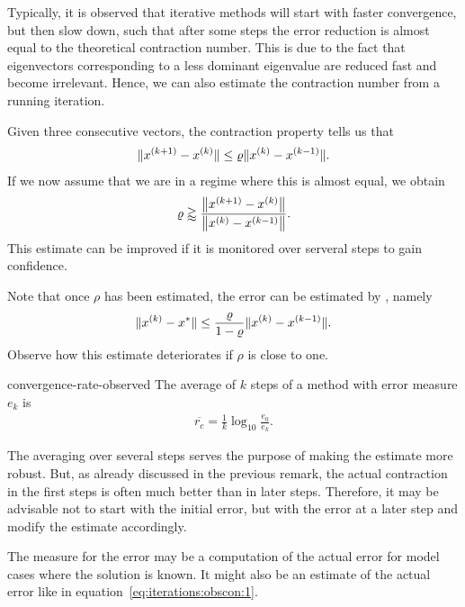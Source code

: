 \begin{remark}
  Typically, it is observed that iterative methods will start with
  faster convergence, but then slow down, such that after some steps
  the error reduction is almost equal to the theoretical contraction
  number. This is due to the fact that eigenvectors corresponding to a
  less dominant eigenvalue are reduced fast and become
  irrelevant. Hence, we can also estimate the contraction number from
  a running iteration.

  Given three consecutive vectors, the contraction property tells us
  that
  \begin{gather}
    \norm{x^{(k+1)} - x^{(k)}} \le \rho \norm{x^{(k)}-x^{(k-1)}}.
  \end{gather}
  If we now assume that we are in a regime where this is almost equal, we obtain
  \begin{gather}
    \rho \gtrapprox \frac{\norm*{x^{(k+1)} - x^{(k)}}}{\norm*{x^{(k)} - x^{(k-1)}}}.
  \end{gather}
  This estimate can be improved if it is monitored over serveral steps
  to gain confidence.

  Note that once $\rho$ has been estimated, the error can be estimated by
  , namely
  \begin{gather}
    \label{eq:iterations:obscon:1}
    \norm{x^{(k)} - x^*} \le \frac{\rho}{1-\rho} \norm{x^{(k)}-x^{(k-1)}}.
  \end{gather}
  Observe how this estimate deteriorates if $\rho$ is close to one.
\end{remark}

\begin{Definition}{convergence-rate-observed}
  The average  of $k$ steps of a
  method with error measure $e_k$ is
  \begin{gather}
    \overline{r_c} = \frac1k \log_{10}\frac{e_0}{e_k}.
  \end{gather}
\end{Definition}

\begin{remark}
  The averaging over several steps serves the purpose of making the
  estimate more robust. But, as already discussed in the previous
  remark, the actual contraction in the first steps is often much
  better than in later steps. Therefore, it may be advisable not to
  start with the initial error, but with the error at a later step and
  modify the estimate accordingly.

  The measure for the error may be a computation of the actual error
  for model cases where the solution is known. It might also be an
  estimate of the actual error like in
  equation~\eqref{eq:iterations:obscon:1}.
\end{remark}

